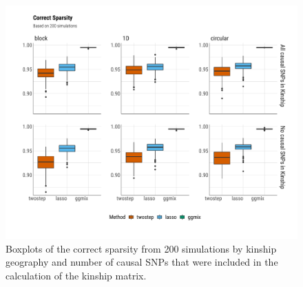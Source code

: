 \documentclass[12pt,letter]{article}\usepackage[]{graphicx}\usepackage[]{color}
\newenvironment{knitrout}{}{} %
\begin{document}
\begin{knitrout}\scriptsize
{}\color{fgcolor}\begin{figure}[H]

{\centering \includegraphics[width=1\linewidth]{figure/plot-correct-sparsity-sim-1} 

}

\caption[Boxplots of the correct sparsity from 200 simulations by kinship geography and number of causal SNPs that were included in the calculation of the kinship matrix]{Boxplots of the correct sparsity from 200 simulations by kinship geography and number of causal SNPs that were included in the calculation of the kinship matrix.}\label{fig:plot-correct-sparsity-sim}
\end{figure}


\end{knitrout}
\end{document}
